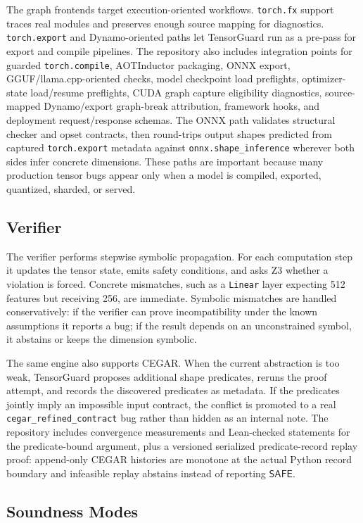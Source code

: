 \documentclass[11pt]{article}
\newcommand{\tg}{TensorGuard}
\newcommand{\safe}{\ensuremath{\mathsf{SAFE}}}
\begin{document}
The graph frontends target execution-oriented workflows.  \texttt{torch.fx}
support traces real modules and preserves enough source mapping for diagnostics.
\texttt{torch.export} and Dynamo-oriented paths let \tg{} run as a pre-pass
for export and compile pipelines.  The repository also includes integration
points for guarded \texttt{torch.compile}, AOTInductor packaging, ONNX export,
GGUF/llama.cpp-oriented checks, model checkpoint load preflights,
optimizer-state load/resume preflights,
CUDA graph capture eligibility diagnostics, source-mapped Dynamo/export
graph-break attribution, framework hooks, and deployment
request/response schemas.  The ONNX path validates structural checker and opset contracts, then
round-trips output shapes predicted from captured \texttt{torch.export} metadata
against \texttt{onnx.shape\_inference} wherever both sides infer concrete
dimensions.  These paths are important because many production tensor bugs
appear only when a model is compiled, exported, quantized, sharded, or served.

\subsection{Verifier}

The verifier performs stepwise symbolic propagation.  For each computation
step it updates the tensor state, emits safety conditions, and asks Z3 whether
a violation is forced.  Concrete mismatches, such as a \texttt{Linear} layer
expecting 512 features but receiving 256, are immediate.  Symbolic mismatches
are handled conservatively: if the verifier can prove incompatibility under
the known assumptions it reports a bug; if the result depends on an unconstrained
symbol, it abstains or keeps the dimension symbolic.

The same engine also supports CEGAR.  When the current abstraction is too weak,
\tg{} proposes additional shape predicates, reruns the proof attempt, and
records the discovered predicates as metadata.  If the predicates jointly imply
an impossible input contract, the conflict is promoted to a real
\texttt{cegar\_refined\_contract} bug rather than hidden as an internal note.
The repository includes convergence measurements and Lean-checked statements
for the predicate-bound argument, plus a versioned serialized predicate-record
replay proof: append-only CEGAR histories are monotone at the actual Python
record boundary and infeasible replay abstains instead of reporting \safe{}.

\subsection{Soundness Modes}
\end{document}
